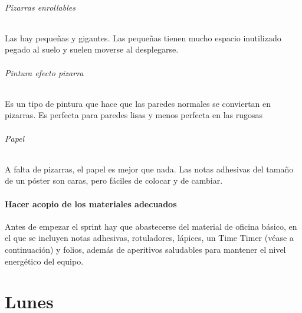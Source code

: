 \documentclass[10pt]{article}
\begin{document}
\begin{multicols}{2}
\paragraph*{Pizarras enrollables}
Las hay pequeñas y gigantes. Las pequeñas tienen mucho espacio inutilizado pegado al suelo y suelen moverse al desplegarse.
\paragraph*{Pintura efecto pizarra}
Es un tipo de pintura que hace que las paredes normales se conviertan en pizarras. Es perfecta para paredes lisas y menos perfecta en las rugosas
\paragraph*{Papel}
A falta de pizarras, el papel es mejor que nada. Las notas adhesivas del tamaño de un póster son caras, pero fáciles de colocar y de cambiar.
\subsection*{Hacer acopio de los materiales adecuados}
Antes de empezar el sprint hay que abastecerse del material de oficina básico, en el que se incluyen notas adhesivas, rotuladores, lápices, un Time Timer (véase a continuación) y folios, además de aperitivos saludables para mantener el nivel energético del equipo.
\end{multicols}
\part*{\center Lunes}

\begin{multicols}{2}
\end{multicols}
\end{document}
